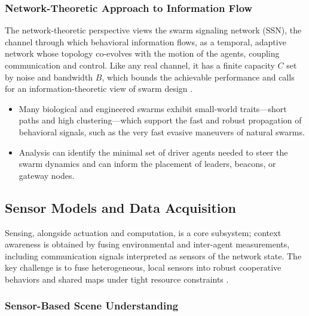 \subsubsection{Network-Theoretic Approach to Information Flow}

The network-theoretic perspective views the swarm signaling network (SSN), the
channel through which behavioral information flows, as a temporal, adaptive
network whose topology co-evolves with the motion of the agents, coupling
communication and control. Like any real channel, it has a finite capacity $C$
set by noise and bandwidth $B$, which bounds the achievable performance and calls
for an information-theoretic view of swarm design \cite{bouffanais2016design}.
\begin{itemize}
  \item {} Many biological and engineered swarms exhibit
        small-world traits---short paths and high clustering---which support the
        fast and robust propagation of behavioral signals, such as the very fast
        evasive maneuvers of natural swarms.
  \item {} Analysis can identify the minimal set of
        driver agents needed to steer the swarm dynamics and can inform the
        placement of leaders, beacons, or gateway nodes.
\end{itemize}

\subsection{Sensor Models and Data Acquisition}

Sensing, alongside actuation and computation, is a core subsystem; context
awareness is obtained by fusing environmental and inter-agent measurements,
including communication signals interpreted as sensors of the network state. The
key challenge is to fuse heterogeneous, local sensors into robust cooperative
behaviors and shared maps under tight resource constraints \cite{hamann2018swarm,dias2021swarm}.

\subsubsection{Sensor-Based Scene Understanding}

